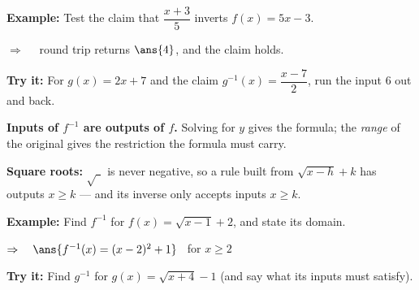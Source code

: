 \documentclass[12pt]{article}
\begin{document}
\begin{examplebox}
\textbf{Example:} \quad Test the claim that $\dfrac{x + 3}{5}$ inverts $f(x) = 5x - 3$.

$\Rightarrow\quad$ round trip returns $\ans{4}$, and the claim holds.
\end{examplebox}

\begin{tryitbox}
\textbf{Try it:} \quad For $g(x) = 2x + 7$ and the claim $g^{-1}(x) = \dfrac{x - 7}{2}$, run the input $6$ out and back.\\[2pt]
\end{tryitbox}


\begin{formulabox}
\textbf{Inputs of $f^{-1}$ are outputs of $f$.} Solving for $y$ gives the formula; the
\emph{range} of the original gives the restriction the formula must carry.\par
\textbf{Square roots:} $\sqrt{\ \ }$ is never negative, so a rule built from
$\sqrt{x - h} + k$ has outputs $x \ge k$ --- and its inverse only accepts inputs $x \ge k$.
\end{formulabox}

\begin{examplebox}
\textbf{Example:} \quad Find $f^{-1}$ for $f(x) = \sqrt{x - 1} + 2$, and state its domain.

$\Rightarrow\quad \ans{f^{-1}(x) = (x - 2)^2 + 1}$ \ for $x \ge 2$
\end{examplebox}

\begin{tryitbox}
\textbf{Try it:} \quad Find $g^{-1}$ for $g(x) = \sqrt{x + 4} - 1$ (and say what its inputs must satisfy).\\[2pt]
\end{tryitbox}
\end{document}
